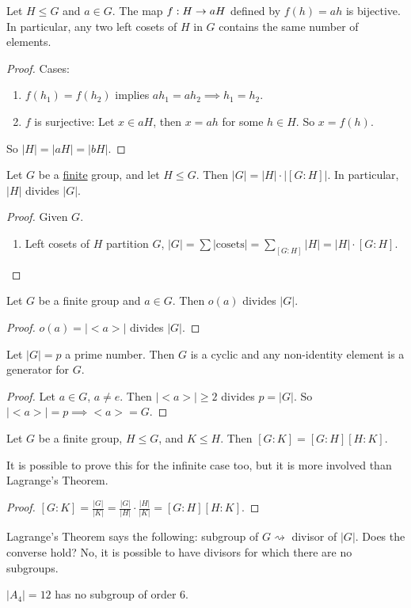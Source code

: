 \documentclass[]{article}
\begin{document}
\begin{proposition}
	Let $H\leq G$ and $a\in G$. The map $f: H\rightarrow aH$ defined by $f(h) = ah$ is bijective.
	In particular, any two left cosets of $H$ in $G$ contains the same number of elements.
\end{proposition}
\begin{proof}
	Cases:
	\begin{enumerate}
		\item $f(h_1) = f(h_2)$ implies $ah_1 = ah_2\implies h_1 = h_2$.
		\item $f$ is surjective: Let $x\in aH$, then $x = ah$ for some $h\in H$. So $x = f(h)$.
	\end{enumerate}
	So $|H| = |aH| = |bH|$.
\end{proof}
\begin{theorem}
	Let $G$ be a \ul{finite} group, and let $H\leq G$. Then $|G| = |H|\cdot|[G:H]|$.
	In particular, $|H|$ divides $|G|$.
\end{theorem}
\begin{proof}
	Given $G$.
	\begin{enumerate}
		\item Left cosets of $H$ partition $G$, $|G| = \sum |\text{cosets}| = \sum_{[G:H]} |H| = |H|\cdot[G:H]$.
	\end{enumerate}
\end{proof}
\begin{corollary}
	Let $G$ be a finite group and $a\in G$. Then $o(a)$ divides $|G|$.
\end{corollary}
\begin{proof}
	$o(a) = |<a>|$ divides $|G|$.
\end{proof}
\begin{corollary}
	Let $|G| = p$ a prime number. Then $G$ is a cyclic and any non-identity element is a generator for $G$.
\end{corollary}
\begin{proof}
	Let $a\in G$, $a\neq e$. Then $|<a>|\geq 2$ divides $p = |G|$. So $|<a>| = p \implies <a> = G$.
\end{proof}
\begin{proposition}
	Let $G$ be a finite group, $H\leq G$, and $K\leq H$. Then $[G:K]=[G:H][H:K]$.
\end{proposition}
\begin{remark}
	It is possible to prove this for the infinite case too, but it is more involved than Lagrange's Theorem.
\end{remark}
\begin{proof}
	$[G:K] = \frac{|G|}{|K|} = \frac{|G|}{|H|}\cdot\frac{|H|}{|K|} = [G:H][H:K]$.
\end{proof}
\begin{remark}
	Lagrange's Theorem says the following: subgroup of $G \rightsquigarrow$ divisor of $|G|$. Does the converse hold? No, it is possible to have divisors for which there are no subgroups.
\end{remark}
\begin{example}
	$|A_4| = 12$ has no subgroup of order 6.
\end{example}
\end{document}
